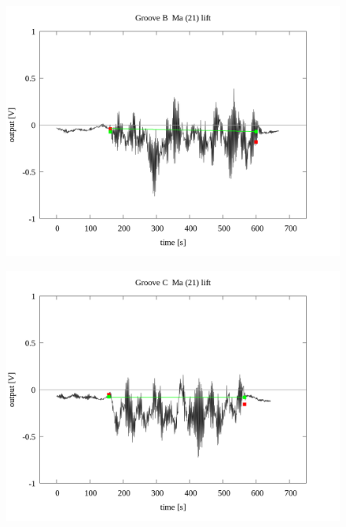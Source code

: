 \documentclass[a4paper]{jsarticle}
\begin{document}
\begin{figure}[htbp]
    \footnotesize
    \begin{center}
        \includegraphics[width=140mm]{../../../../33_result/210806/moving_average/21/lift/03/Groove_B_ma(21)_lift_03.png}
    \end{center}
\end{figure}

\begin{figure}[htbp]
    \footnotesize
    \begin{center}
        \includegraphics[width=140mm]{../../../../33_result/210806/moving_average/21/lift/03/Groove_C_ma(21)_lift_03.png}
    \end{center}
\end{figure}
\end{document}
